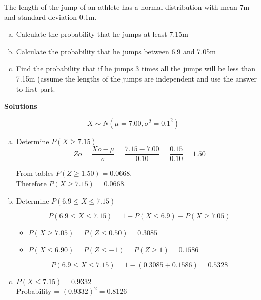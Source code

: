 \documentclass[a4paper,12pt]{article}
\begin{document}
\noindent The length of the jump of an athlete has a normal distribution with mean 7m and standard deviation 0.1m. 



\begin{enumerate}[(a)]
	\item 
	Calculate the probability that he jumps at least 7.15m
	
\item 
	Calculate the probability that he jumps between 6.9 and 7.05m
	
\item 
	Find the probability that if he jumps 3 times all the jumps will be less than 7.15m (assume the lengths of the jumps are independent and use the answer to first part.  
	
\end{enumerate}

\noindent \textbf{Solutions}

\[ X \sim N(\mu = 7.00,  \sigma^2 = 0.1^2 )\]


\begin{enumerate}[(a)]
    \item Determine $P(X \geq 7.15) $               
\[Zo=\frac{Xo-\mu}{\sigma} = \frac{7.15 - 7.00}{0.10}=\frac{0.15}{0.10}=1.50\]

From tables $P(Z\geq 1.50) = 0.0668$. \\        
Therefore $P(X\geq 7.15) = 0.0668$.

\item Determine $P(6.9\leq X \leq 7.15)$


\[P(6.9 \leq X \leq 7.15) = 1 - P(X\leq 6.9 ) - P(X \geq 7.05 )\]
\begin{itemize}
\item $P(X\geq 7.05 ) = P(Z \leq 0.50 ) = 0.3085 $  
\item $P(X\leq 6.90 ) = P(Z \leq -1 )= P(Z \geq 1 ) = 0.1586$
\end{itemize}
\[P(6.9 \leq X \leq 7.15) = 1 - (0.3085+0.1586) = 0.5328\]      

\item             
$P(X\leq 7.15) = 0.9332$\\         Probability = $(0.9332)^2= 0.8126$

\end{enumerate}
\end{document}
